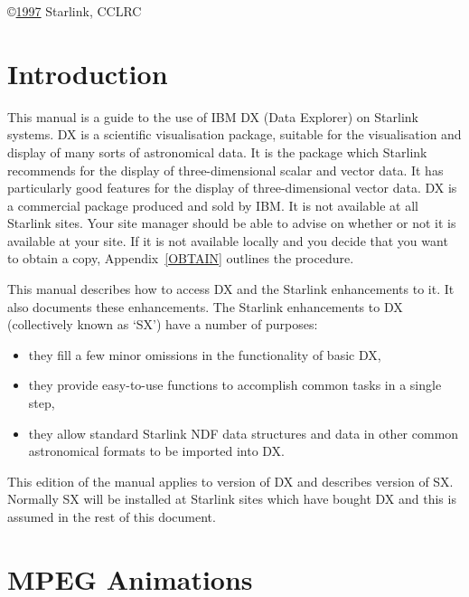\vspace{2.5cm}
\copyright \underline{1997} Starlink, CCLRC


\cleardoublepage
\renewcommand{\thepage}{\arabic{page}}
\setcounter{page}{1}

\section{Introduction  }

This manual is a guide to the use of IBM DX (Data Explorer) on
Starlink systems. DX is a scientific visualisation package, suitable
for the visualisation and display of many sorts of astronomical data.
It is the package which Starlink recommends for the display of
three-dimensional scalar and vector data. It has particularly good
features for the display of three-dimensional vector data. DX is a
commercial package produced and sold by IBM. It is not available at all
Starlink sites. Your site manager should be able to advise on whether or
not it is available at your site. If it is not available locally and you 
decide that you want to obtain a copy, Appendix~\ref{OBTAIN} outlines the
procedure.

This manual describes how to access DX and the Starlink enhancements to
it. It also documents these enhancements. The Starlink enhancements to
DX (collectively known as `SX') have a number of purposes:

\begin{itemize}

  \item they fill a few minor omissions in the functionality of basic
   DX,

  \item they provide easy-to-use functions to accomplish common tasks
   in a single step,

  \item they allow standard Starlink NDF data structures and data in
   other common astronomical formats to be imported into DX.

\end{itemize}

This edition of the manual applies to version \DXversion of DX and
describes version \SXversion of SX.  Normally SX will be installed at
Starlink sites which have bought DX and this is assumed in the rest of
this document.


\section{MPEG Animations  }


